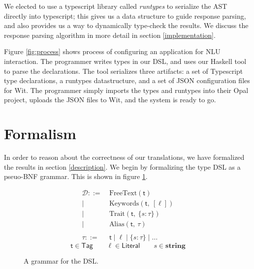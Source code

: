\documentclass[twocolumn]{article}
\newcommand{\fcy}[1]{\mathcal{#1}}
\newcommand{\etag}[1]{\textsf{#1}}
\begin{document}
\begin{figure*}
  \centering
  \caption{The configuration process.}
  \label{fig:process}
\end{figure*}

We elected to use a typescript library called \emph{runtypes} to serialize the
AST directly into typescript; this gives us a data structure to guide response
parsing, and also provides us a way to dynamically type-check the results. We
discuss the response parsing algorithm in more detail in section
\ref{implementation}.

Figure \ref{fig:process} shows process of configuring an application for NLU
interaction. The programmer writes types in our DSL, and uses our Haskell tool
to parse the declarations. The tool serializes three artifacts: a set of
Typescript type declarations, a runtypes datastructure, and a set of JSON
configuration files for Wit. The programmer simply imports the types and
runtypes into their Opal project, uploads the JSON files to Wit, and the system
is ready to go.

\section{Formalism} \label{formalism}
In order to reason about the correctness of our translations, we have formalized
the results in section \ref{description}. We begin by formalizing the type DSL
as a pseuo-BNF grammar. This is shown in figure \ref{fig:grammar}.

\begin{figure}
  \centering
  \begin{align*}
    \fcy{D} ::=&\ \text{FreeText}(\etag{t}) \\
    |&\ \text{Keywords}(\etag{t},\ [\ell]) \\
    |&\ \text{Trait}(\etag{t},\ \{s: \tau\}) \\
    |&\ \text{Alias}(\etag{t},\ \tau) \\
    \\
    \tau ::=&\ \etag{t} \mid \ell \mid \{s: \tau\} \mid \dots
  \end{align*}
  $$ \etag{t} \in \textsf{Tag} \qquad \ell \in \textsf{Literal} \qquad s \in
  \textbf{string} $$
  \caption{A grammar for the DSL.}
  \label{fig:grammar}
\end{figure}
\end{document}
